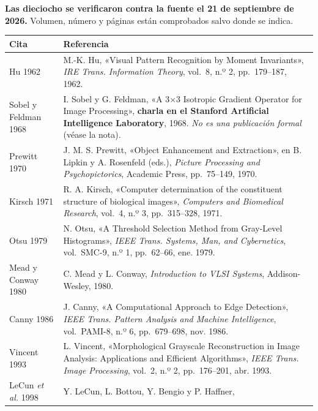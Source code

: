 \textbf{Las dieciocho se verificaron contra la fuente el 21 de
septiembre de 2026.} Volumen, número y páginas están comprobados salvo
donde se indica.

\begin{longtable}[]{@{}
  >{\raggedright\arraybackslash}p{}
  >{\raggedright\arraybackslash}p{}@{}}
\toprule\noalign{}
\begin{minipage}[b]{\linewidth}\raggedright
Cita
\end{minipage} & \begin{minipage}[b]{\linewidth}\raggedright
Referencia
\end{minipage} \\
\midrule\noalign{}
\endhead
\bottomrule\noalign{}
\endlastfoot
Hu 1962 & M.-K. Hu, «Visual Pattern Recognition by Moment Invariants»,
\emph{IRE Trans. Information Theory}, vol.~8, n.º 2, pp.~179--187,
1962. \\
Sobel y Feldman 1968 & I. Sobel y G. Feldman, «A 3×3 Isotropic Gradient
Operator for Image Processing», \textbf{charla en el Stanford Artificial
Intelligence Laboratory}, 1968. \emph{No es una publicación formal}
(véase la nota). \\
Prewitt 1970 & J. M. S. Prewitt, «Object Enhancement and Extraction», en
B. Lipkin y A. Rosenfeld (eds.), \emph{Picture Processing and
Psychopictorics}, Academic Press, pp.~75--149, 1970. \\
Kirsch 1971 & R. A. Kirsch, «Computer determination of the constituent
structure of biological images», \emph{Computers and Biomedical
Research}, vol.~4, n.º 3, pp.~315--328, 1971. \\
Otsu 1979 & N. Otsu, «A Threshold Selection Method from Gray-Level
Histograms», \emph{IEEE Trans. Systems, Man, and Cybernetics},
vol.~SMC-9, n.º 1, pp.~62--66, ene. 1979. \\
Mead y Conway 1980 & C. Mead y L. Conway, \emph{Introduction to VLSI
Systems}, Addison-Wesley, 1980. \\
Canny 1986 & J. Canny, «A Computational Approach to Edge Detection»,
\emph{IEEE Trans. Pattern Analysis and Machine Intelligence},
vol.~PAMI-8, n.º 6, pp.~679--698, nov. 1986. \\
Vincent 1993 & L. Vincent, «Morphological Grayscale Reconstruction in
Image Analysis: Applications and Efficient Algorithms», \emph{IEEE
Trans. Image Processing}, vol.~2, n.º 2, pp.~176--201, abr. 1993. \\
LeCun \emph{et al.} 1998 & Y. LeCun, L. Bottou, Y. Bengio y P. Haffner,

\end{longtable}

